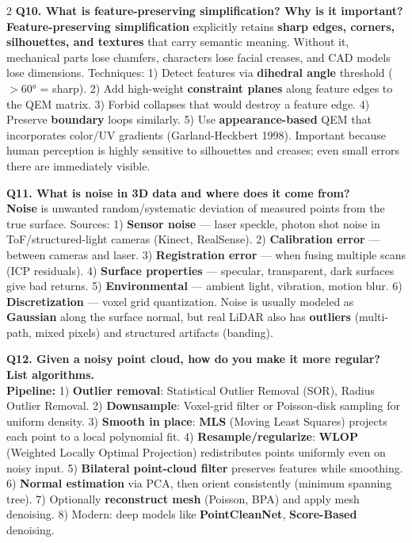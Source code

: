 \begin{paracol}{2}
\textbf{Q10. What is feature-preserving simplification? Why is it important?}\\
\textbf{Feature-preserving simplification} explicitly retains \textbf{sharp edges, corners, silhouettes, and textures} that carry semantic meaning. Without it, mechanical parts lose chamfers, characters lose facial creases, and CAD models lose dimensions. Techniques: 1) Detect features via \textbf{dihedral angle} threshold ($> 60°$ = sharp). 2) Add high-weight \textbf{constraint planes} along feature edges to the QEM matrix. 3) Forbid collapses that would destroy a feature edge. 4) Preserve \textbf{boundary} loops similarly. 5) Use \textbf{appearance-based} QEM that incorporates color/UV gradients (Garland-Heckbert 1998). Important because human perception is highly sensitive to silhouettes and creases; even small errors there are immediately visible.

\textbf{Q11. What is noise in 3D data and where does it come from?}\\
\textbf{Noise} is unwanted random/systematic deviation of measured points from the true surface. Sources: 1) \textbf{Sensor noise} — laser speckle, photon shot noise in ToF/structured-light cameras (Kinect, RealSense). 2) \textbf{Calibration error} — between cameras and laser. 3) \textbf{Registration error} — when fusing multiple scans (ICP residuals). 4) \textbf{Surface properties} — specular, transparent, dark surfaces give bad returns. 5) \textbf{Environmental} — ambient light, vibration, motion blur. 6) \textbf{Discretization} — voxel grid quantization. Noise is usually modeled as \textbf{Gaussian} along the surface normal, but real LiDAR also has \textbf{outliers} (multi-path, mixed pixels) and structured artifacts (banding).

\textbf{Q12. Given a noisy point cloud, how do you make it more regular? List algorithms.}\\
\textbf{Pipeline:} 1) \textbf{Outlier removal}: Statistical Outlier Removal (SOR), Radius Outlier Removal. 2) \textbf{Downsample}: Voxel-grid filter or Poisson-disk sampling for uniform density. 3) \textbf{Smooth in place}: \textbf{MLS} (Moving Least Squares) projects each point to a local polynomial fit. 4) \textbf{Resample/regularize}: \textbf{WLOP} (Weighted Locally Optimal Projection) redistributes points uniformly even on noisy input. 5) \textbf{Bilateral point-cloud filter} preserves features while smoothing. 6) \textbf{Normal estimation} via PCA, then orient consistently (minimum spanning tree). 7) Optionally \textbf{reconstruct mesh} (Poisson, BPA) and apply mesh denoising. 8) Modern: deep models like \textbf{PointCleanNet}, \textbf{Score-Based} denoising.


\end{paracol}
